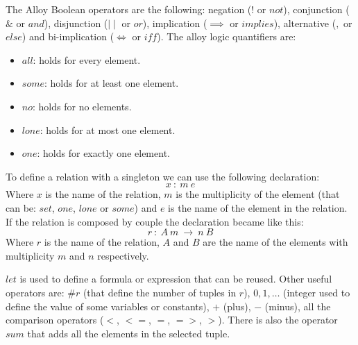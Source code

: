 \documentclass[12pt, a4paper]{report}
\newtheorem[style=M,bodystyle=\normalfont]{theorem}{Theorem}
\newtheorem[style=M,bodystyle=\normalfont]{corollary}{Corollary}
\newtheorem[style=M,bodystyle=\normalfont]{lemma}{Lemma}
\newtheorem[style=M,bodystyle=\normalfont]{definition}{Definition}
\begin{document}
        The Alloy Boolean operators are the following: negation ($!$ or $not$), conjunction ($\&$ or $and$), disjunction ($\mid \mid$ or $or$), implication ($\implies$ or $implies$), alternative ($,$ or $else$) and bi-implication ($\iff$ or $iff$). The alloy logic quantifiers are: 
        \begin{itemize}
            \item $all$: holds for every element.
            \item $some$: holds for at least one element.
            \item $no$: holds for no elements.
            \item $lone$: holds for at most one element.
            \item $one$: holds for exactly one element.
        \end{itemize}
        To define a relation with a singleton we can use the following declaration: 
        \[x \: : \: m \: e\]
        Where $x$ is the name of the relation, $m$ is the multiplicity of the element (that can be: $set$, $one$, $lone$ or $some$) and $e$ is the name of the element in the relation. If the relation is composed by couple the declaration became like this: 
        \[r \: : \: A \: m \: \rightarrow \: n \: B\]
        Where $r$ is the name of the relation, $A$ and $B$ are the name of the elements with multiplicity $m$ and $n$ respectively.
         
        $let$ is used to define a formula or expression that can be reused. Other useful operators are: $\# r$ (that define the number of tuples in $r$), $0,1,\dots$ (integer used to define the value of some variables or constants), $+$ (plus), $-$ (minus), all the comparison operators ($<$, $<=$, $=$, $=>$, $>$). There is also the operator $sum$ that adds all the elements in the selected tuple. 
        
    \newpage




    

    
\end{document}
